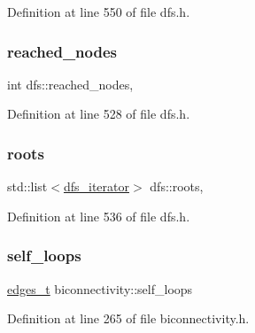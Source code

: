 Definition at line 550 of file dfs.\+h.

\mbox{\label{classdfs_acb11186a1a2a2a1f38cdc0674340ba37}} 
\subsubsection{\texorpdfstring{reached\+\_\+nodes}{reached\_nodes}}
{\footnotesize\ttfamily int dfs\+::reached\+\_\+nodes\hspace{0.3cm}{\ttfamily [protected]}, {\ttfamily [inherited]}}



Definition at line 528 of file dfs.\+h.

\mbox{\label{classdfs_a0bbd5cb8df26c891b74dadd84b46a06b}} 
\subsubsection{\texorpdfstring{roots}{roots}}
{\footnotesize\ttfamily std\+::list$<$\mbox{\hyperlink{classdfs_a15fe023a5a1f7ddda00f3d87110d9a32}{dfs\+\_\+iterator}}$>$ dfs\+::roots\hspace{0.3cm}{\ttfamily [protected]}, {\ttfamily [inherited]}}



Definition at line 536 of file dfs.\+h.

\mbox{\label{classbiconnectivity_ad6b936f8450b97a34c93c7c2196571a1}} 
\subsubsection{\texorpdfstring{self\+\_\+loops}{self\_loops}}
{\footnotesize\ttfamily \mbox{\hyperlink{edge_8h_a8f9587479bda6cf612c103494b3858e3}{edges\+\_\+t}} biconnectivity\+::self\+\_\+loops\hspace{0.3cm}{\ttfamily [protected]}}



Definition at line 265 of file biconnectivity.\+h.

